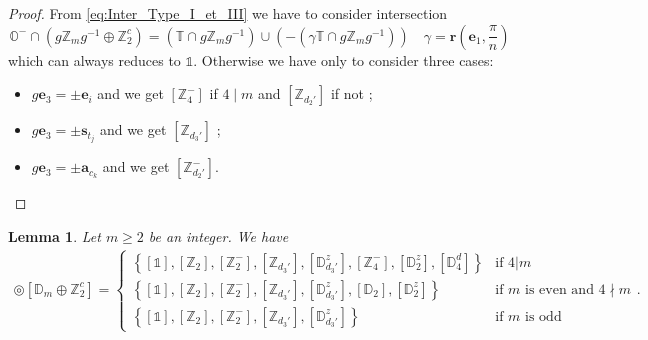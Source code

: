\documentclass[11pt,a4paper]{amsart}
\newtheorem{lem}[thm]{Lemma}
\theoremstyle{definition}
\newcommand{\ZZ}{\mathbb{Z}}                %
\newcommand{\SO}{\mathrm{SO}}               %
\newcommand{\octa}{\mathbb{O}}              %
\newcommand{\tetra}{\mathbb{T}}             %
\newcommand{\DD}{\mathbb{D}}                %
\newcommand{\1}{\mathds{1}}		            %
\newcommand{\ee}{\pmb{e}}                   %
\newcommand{\uu}{\pmb{u}}                   %
\newcommand{\vR}{\mathbf{r}}
\newcommand{\bs}{\mathbf{s}}
\newcommand{\set}[1]{\left\{#1\right\}}     %
\begin{document}
\begin{proof}
	From \eqref{eq:Inter_Type_I_et_III} we have to consider intersection
	\begin{equation*}
		\octa^- \cap (g\ZZ_m g^{-1} \oplus \ZZ_2^c)=(\tetra\cap g \ZZ_m g^{-1})\cup (-(\gamma\tetra\cap g \ZZ_m g^{-1}))\quad \gamma=\vR\left(\ee_1,\frac{\pi}{n}\right)
	\end{equation*}
	which can always reduces to $\1$. Otherwise we have only to consider three cases:
	\begin{itemize}
		\item $g\ee_3=\pm\ee_i$ and we get $[\ZZ_4^-]$ if $4\mid m$ and $[\ZZ_{d_2'}]$ if not ;
		\item $g\ee_3=\pm\pmb{s}_{t_j}$ and we get $[\ZZ_{d_3'}]$ ;
		\item $g\ee_3=\pm\pmb{a}_{c_k}$ and we get $[\ZZ_{d_2'}^-]$.
	\end{itemize}
\end{proof}


\begin{lem}
  Let $m\geq 2$ be an integer. We have
  \begin{align*}
    [\octa^-] \circledcirc [\DD_m \oplus \ZZ_2^c]=
    \begin{cases}
      \set{[\1],[\ZZ_2],[\ZZ_{2}^-],[\ZZ_{d_3'}],[\DD_{d_3'}^z],[\ZZ_4^-],[\DD_2^z],[\DD_4^d]} & \text{if $4|m$}                      \\
      \set{[\1],[\ZZ_2],[\ZZ_{2}^-],[\ZZ_{d_3'}],[\DD_{d_3'}^z],[\DD_2],[\DD_2^z]}             & \text{if $m$ is even and $4\nmid m$} \\
      \set{[\1],[\ZZ_2],[\ZZ_2^-],[\ZZ_{d_3'}],[\DD_{d_3'}^z]}                                 & \text{if $m$ is odd}
    \end{cases}.
  \end{align*}
\end{lem}
\end{document}
